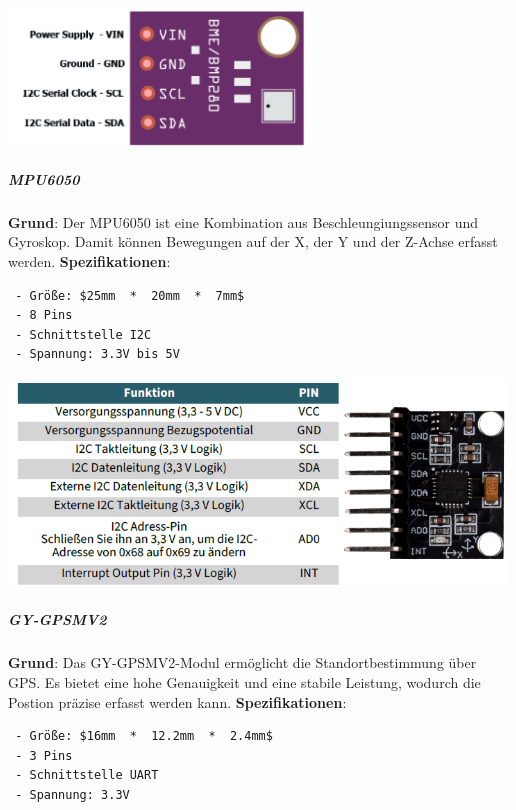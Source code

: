 \documentclass[
    headings=optiontotocandhead,%
    twoside,
    numbers=noenddot,%
    12pt, %
    titlepage, %
    parskip=full, %
    listof=leveldown, 
    numbers=noenddot, %
    a4paper,DIV=14,
    BCOR=15mm,
]{scrbook}
\let\origfigure=\figure
\let\endorigfigure=\endfigure
\renewenvironment{figure}[1][]{%
   \origfigure[H]
}{%
   \endorigfigure
}
\begin{document}
\begin{figure}
\centering
\includegraphics[width=3.125in,height=\textheight]{img/Kampl/BME280-Pins.png}
\caption{BMEPins {[}\protect\hyperlink{ref-BME280-Datenblatt}{19}{]}}
\end{figure}

\hypertarget{mpu6050}{%
\subparagraph{MPU6050}\label{mpu6050}}

\textbf{Grund}: Der MPU6050 ist eine Kombination aus
Beschleungiungssensor und Gyroskop. Damit können Bewegungen auf der X,
der Y und der Z-Achse erfasst werden. \textbf{Spezifikationen}:

\begin{lstlisting}
 - Größe: $25mm  *  20mm  *  7mm$
 - 8 Pins
 - Schnittstelle I2C
 - Spannung: 3.3V bis 5V
\end{lstlisting}

\begin{figure}
\centering
\includegraphics[width=5.20833in,height=\textheight]{img/Kampl/MPU6050-Pins.png}
\caption{MPUPins {[}\protect\hyperlink{ref-MPU6050-Datenblatt}{20}{]}}
\end{figure}

\hypertarget{gy-gpsmv2}{%
\subparagraph{GY-GPSMV2}\label{gy-gpsmv2}}

\textbf{Grund}: Das GY-GPSMV2-Modul ermöglicht die Standortbestimmung
über GPS. Es bietet eine hohe Genauigkeit und eine stabile Leistung,
wodurch die Postion präzise erfasst werden kann.
\textbf{Spezifikationen}:

\begin{lstlisting}
 - Größe: $16mm  *  12.2mm  *  2.4mm$
 - 3 Pins
 - Schnittstelle UART
 - Spannung: 3.3V
\end{lstlisting}
\end{document}
